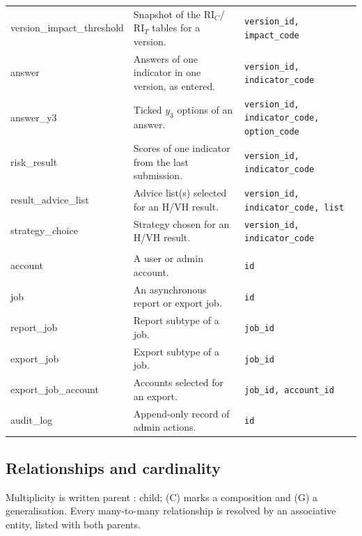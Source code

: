 \documentclass[11pt,a4paper]{article}
\newcommand{\RIC}{\mathrm{RI}_{C}}
\newcommand{\RIT}{\mathrm{RI}_{T}}
\begin{document}
{\begin{longtable}{@{}>{\ttfamily}l R{7.2cm} R{4.2cm}@{}}
version\_impact\_threshold & Snapshot of the $\RIC$/$\RIT$ tables for a version. & \texttt{version\_id, impact\_code} \\
answer & Answers of one indicator in one version, as entered. & \texttt{version\_id, indicator\_code} \\
answer\_y3 & Ticked $y_3$ options of an answer. & \texttt{version\_id, indicator\_code, option\_code} \\
risk\_result & Scores of one indicator from the last submission. & \texttt{version\_id, indicator\_code} \\
result\_advice\_list & Advice list(s) selected for an H/VH result. & \texttt{version\_id, indicator\_code, list} \\
strategy\_choice & Strategy chosen for an H/VH result. & \texttt{version\_id, indicator\_code} \\
\\
account & A user or admin account. & \texttt{id} \\
job & An asynchronous report or export job. & \texttt{id} \\
report\_job & Report subtype of a job. & \texttt{job\_id} \\
export\_job & Export subtype of a job. & \texttt{job\_id} \\
export\_job\_account & Accounts selected for an export. & \texttt{job\_id, account\_id} \\
audit\_log & Append-only record of admin actions. & \texttt{id} \\
\bottomrule
\end{longtable}}

\subsection{Relationships and cardinality}
Multiplicity is written parent : child; (C) marks a composition and (G) a generalisation. Every many-to-many relationship is resolved by an associative entity, listed with both parents.
\end{document}
